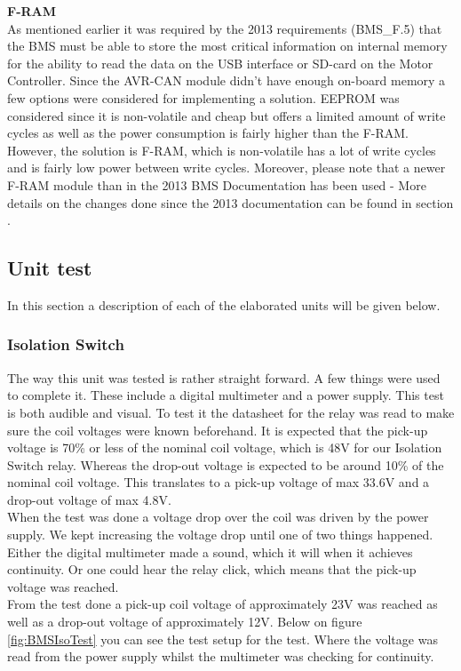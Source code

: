 \textbf{F-RAM}\\
As mentioned earlier it was required by the 2013 requirements (BMS\_F.5) that the BMS must be able to store the most critical information on internal memory for the ability to read the data on the USB interface or SD-card on the Motor Controller. Since the AVR-CAN module didn't have enough on-board memory a few options were considered for implementing a solution. EEPROM was considered since it is non-volatile and cheap but offers a limited amount of write cycles as well as the power consumption is fairly higher than the  F-RAM. However, the solution is F-RAM, which is non-volatile has a lot of write cycles and is fairly low power between write cycles. Moreover, please note that a newer F-RAM module than in the 2013 BMS Documentation has been used - More details on the changes done since the 2013 documentation can be found in section .  

\subsection{Unit test}
In this section a description of each of the elaborated units will be given below. 

\subsubsection{Isolation Switch}
The way this unit was tested is rather straight forward. A few things were used to complete it. These include a digital multimeter and a power supply. This test is both audible and visual. To test it the datasheet  for the relay was read to make sure the coil voltages were known beforehand. It is expected that the pick-up voltage is 70\% or less of the nominal coil voltage, which is 48V for our Isolation Switch relay. Whereas the drop-out voltage is expected to be around 10\% of the nominal coil voltage. This translates to a pick-up voltage of max 33.6V and a drop-out voltage of max 4.8V.\\
When the test was done a voltage drop over the coil was driven by the power supply. We kept increasing the voltage drop until one of two things happened. Either the digital multimeter made a sound, which it will when it achieves continuity. Or one could hear the relay click, which means that the pick-up voltage was reached.\\
From the test done a pick-up coil voltage of approximately 23V was reached as well as a drop-out voltage of approximately 12V. Below on figure \vref{fig:BMSIsoTest} you can see the test setup for the test. Where the voltage was read from the power supply whilst the multimeter was checking for continuity. 

